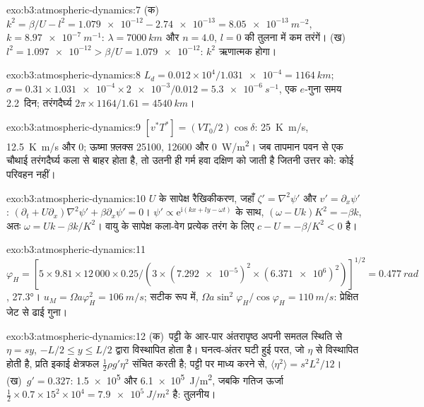 \begin{solution}{exo:b3:atmospheric-dynamics:7}
(क)~$k^2 = \beta/U - l^2 = \num{1.079e-12} - \num{2.74e-13} =
\qty{8.05e-13}{m^{-2}}$, $k = \qty{8.97e-7}{m^{-1}}$: $\lambda =
\qty{7000}{km}$ और $n = 4.0$, $l = 0$ की तुलना में कम तरंगें। (ख)~$l^2 =
\num{1.097e-12} > \beta/U = \num{1.079e-12}$: $k^2$ ऋणात्मक होगा।
\end{solution}

\begin{solution}{exo:b3:atmospheric-dynamics:8}
$L_d = 0.012\times10^4/\num{1.031e-4} = \qty{1164}{km}$; $\sigma =
0.31\times\num{1.031e-4}\times\num{2e-3}/0.012 = \qty{5.3e-6}{s^{-1}}$, एक
$e$-गुना समय \num{2.2}~दिन; तरंगदैर्घ्य $2\pi\times1164/1.61 =
\qty{4540}{km}$।
\end{solution}

\begin{solution}{exo:b3:atmospheric-dynamics:9}
$[v^*T^*] = (VT_0/2)\cos\delta$: \qty{25}{K.m/s}, \qty{12.5}{K.m/s} और 0;
ऊष्मा फ़्लक्स \num{25100}, \num{12600} और \qty{0}{W/m^2}। जब तापमान
पवन से एक चौथाई तरंगदैर्घ्य कला से बाहर होता है, तो उतनी ही गर्म हवा दक्षिण
को जाती है जितनी उत्तर को: कोई परिवहन नहीं।
\end{solution}

\begin{solution}{exo:b3:atmospheric-dynamics:10}
$U$ के सापेक्ष रैखिकीकरण, जहाँ $\zeta' = \nabla^2\psi'$ और $v' =
\partial_x\psi'$: $(\partial_t + U\partial_x)\nabla^2\psi' + \beta\partial_x
\psi' = 0$। $\psi' \propto \mathrm e^{\mathrm i(kx + ly - \omega t)}$ के
साथ, $(\omega - Uk)K^2 = -\beta k$, अतः $\omega = Uk - \beta k/K^2$। वायु के
सापेक्ष कला-वेग प्रत्येक तरंग के लिए $c - U = -\beta/K^2 < 0$ है।
\end{solution}

\begin{solution}{exo:b3:atmospheric-dynamics:11}
$\varphi_H = [5\times9.81\times12\,000\times0.25/(3\times(\num{7.292e-5})^2
\times(\num{6.371e6})^2)]^{1/2} = \qty{0.477}{rad}$, \ang{27.3}।
$u_M = \Omega a\varphi_H^2 = \qty{106}{m/s}$; सटीक रूप में, $\Omega a\sin^2
\varphi_H/\cos\varphi_H = \qty{110}{m/s}$: प्रेक्षित जेट से
ढाई गुना।
\end{solution}

\begin{solution}{exo:b3:atmospheric-dynamics:12}
(क)~पट्टी के आर-पार अंतरापृष्ठ अपनी समतल स्थिति से $\eta = sy$, $-L/2 \le y
\le L/2$ द्वारा विस्थापित होता है। घनत्व-अंतर घटी हुई परत, जो
$\eta$ से विस्थापित होती है, प्रति इकाई क्षेत्रफल $\tfrac12\rho g'\eta^2$ संचित करती
है; पट्टी पर माध्य करने से, $\langle\eta^2\rangle = s^2L^2/12$। (ख)~$g' = 0.327$:
\num{1.5e5} और \qty{6.1e5}{J/m^2}, जबकि गतिज ऊर्जा $\tfrac12\times0.7\times15^2
\times10^4 = \qty{7.9e5}{J/m^2}$ है: तुलनीय।
\end{solution}

